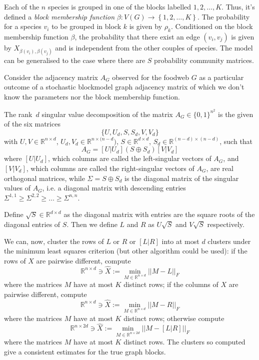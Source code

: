 \documentclass[12pt]{article}
\newcommand{\RR}{\mathbb{R}}
\theoremstyle{definition}
\begin{document}
Each of the $n$ species is grouped in one of the blocks labelled $1, 2, \dots , K$. Thus, it's defined a {\em block membership function} $ \beta : V(G) \to \left\{ 1, 2, \dots , K \right\} $. The probability for a species $v_i$ to be grouped in block $k$ is given by $\rho_k$. Conditioned on the block membership function $\beta$, the probability that there exist an edge $\left( v_i, v_j \right)$ is given by $X_{\beta{(v_i)},\beta{(v_j)}}$ and is independent from the other couples of species. The model can be generalised to the case where there are $S$ probability community matrices.

Consider the adjacency matrix $A_G$ observed for the foodweb $G$ as a particular outcome of a stochastic blockmodel graph adjacency matrix of which we don't know the parameters nor the block membership function.

The rank~$d$ singular value decomposition of the matrix $A_G \in \{0,1\}^{n^2}$ is the given of the six matrices
\[
\{U,U_d,S,S_d,V,V_d\}
\]
with $U, V \in \RR^{n \times d}$, $U_d,V_d \in \RR^{n \times (n-d})$, $S \in \RR^{d \times d}$, $S_d \in \RR^{(n-d)\times (n-d)}$, such that
\[
A_G = \left[ U | U_d \right] \left( S \oplus S_d \right) \left[ V | V_d \right]
\]
where $\left[ U | U_d \right]$, which columns are called the left-singular vectors of $A_G$, and  $\left[ V | V_d \right]$, which columns are called the right-singular vectors of $A_G$, are real orthogonal matrices, while $\Sigma = S \oplus S_d$ is the diagonal matrix of the singular values of $A_G$, i.e. a diagonal matrix with descending entries $\Sigma^{1,1} \geq \Sigma^{2,2} \geq \dots \geq \Sigma^{n,n}$.

Define $\sqrt{S} \in \RR^{d \times d}$ as the diagonal matrix with entries are the square roots of the diagonal entries of $S$. Then we define $L$ and $R$ as $U \sqrt{S}$ and $V \sqrt{S}$ respectively.

We can, now, cluster the rows of $L$ or $R$ or $\left[ L | R \right]$ into at most $d$ clusters under the minimum least squares criterion (but other algorithm could be used): if the rows of $X$ are pairwise different, compute
\[
\RR^{n \times d} \ni \hat{X} := \min_{M \in \RR^{n \times d}} || M - L ||_F
\]
where the matrices $M$ have at most $K$ distinct rows; if the columns of $X$ are pairwise different, compute
\[
\RR^{n \times d} \ni \hat{X} := \min_{M \in \RR^{n \times d}} || M - R ||_F
\]
where the matrices $M$ have at most $K$ distinct rows; otherwise compute
\[
\RR^{n \times 2d} \ni \hat{X} := \min_{M \in \RR^{n \times 2d}} || M - \left[ L | R \right]||_F
\]
where the matrices $M$ have at most $K$ distinct rows. The clusters so computed give a consistent estimates for the true graph blocks.
\end{document}
